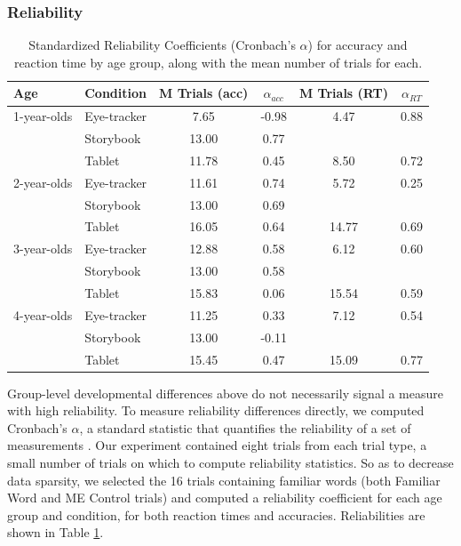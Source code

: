 \documentclass[man,noapacite]{apa2}
\begin{document}
\subsubsection{Reliability}

\begin{table}[t]
\centering
\caption{\label{tab:reliability} Standardized Reliability Coefficients (Cronbach's $\alpha$)  for accuracy and reaction time by age group, along with the mean number of trials for each.}
\begin{tabular}{llcccc}
  \hline
Age & Condition & M Trials (acc) & $\alpha_{acc}$ & M Trials (RT) & $\alpha_{RT}$ \\ 
  \hline
1-year-olds & Eye-tracker & 7.65 & -0.98 & 4.47 & 0.88\\ 
    & Storybook & 13.00 & 0.77 & & \\ 
    & Tablet & 11.78 & 0.45 & 8.50 & 0.72\\ 
2-year-olds & Eye-tracker & 11.61 & 0.74 & 5.72 & 0.25 \\ 
    & Storybook & 13.00 & 0.69 & & \\ 
    & Tablet & 16.05 & 0.64 & 14.77 & 0.69\\ 
3-year-olds & Eye-tracker & 12.88 & 0.58 & 6.12 & 0.60\\ 
    & Storybook & 13.00 & 0.58 & & \\ 
    & Tablet & 15.83 & 0.06 & 15.54 & 0.59 \\ 
4-year-olds & Eye-tracker & 11.25 & 0.33  & 7.12 & 0.54 \\ 
    & Storybook & 13.00 & -0.11& &  \\ 
    & Tablet & 15.45 & 0.47 & 15.09 & 0.77 \\ 
   \hline
\end{tabular}
\end{table}

Group-level developmental differences above do not necessarily signal a measure with high reliability. To measure reliability differences directly, we computed Cronbach's $\alpha$, a standard statistic that quantifies the reliability of a set of measurements \cite{santos1999}. Our experiment contained eight trials from each trial type, a small number of trials on which to compute reliability statistics. So as to decrease data sparsity, we selected the 16 trials containing familiar words (both Familiar Word and ME Control trials) and computed a reliability coefficient for each age group and condition, for both reaction times and accuracies. Reliabilities are shown in Table \ref{tab:reliability}. 
\end{document}
